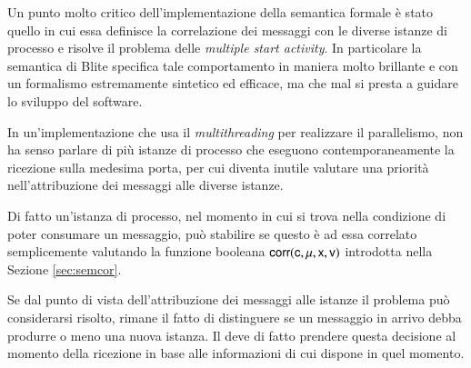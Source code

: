 Un punto molto critico dell'implementazione della semantica formale è stato quello
in cui essa definisce la correlazione dei messaggi con le diverse istanze di
processo e risolve il problema delle \emph{multiple start activity}. In
particolare la semantica di Blite specifica tale comportamento in maniera molto
brillante e con un formalismo estremamente sintetico ed efficace, ma che mal
si presta a guidare lo sviluppo del software. 

In un'implementazione che usa il \emph{multithreading} per realizzare il
parallelismo, non ha senso parlare di più istanze di processo che eseguono
contemporaneamente la ricezione sulla medesima porta, per cui diventa inutile
valutare una priorità nell'attribuzione dei messaggi alle diverse istanze.

Di fatto un'istanza di processo, nel momento in cui si trova nella condizione
di poter consumare un messaggio, può stabilire se questo è ad essa
correlato semplicemente valutando la funzione booleana ${\sf corr}({\sf c},
{\sf \mu}, {\sf x}, {\sf v})$ introdotta nella Sezione \ref{sec:semcor}.



Se dal punto di vista dell'attribuzione dei messaggi alle istanze il problema
può considerarsi risolto, rimane il fatto di distinguere se un
messaggio in arrivo debba produrre o meno una nuova istanza. Il
 deve di fatto prendere questa decisione al momento della
ricezione in base alle informazioni di cui dispone in quel momento. 

